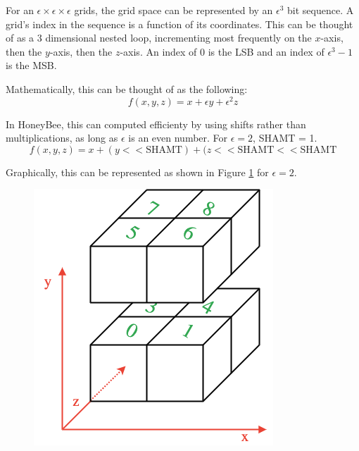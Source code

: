 For an $\epsilon \times \epsilon \times \epsilon$ grids, the grid space can be represented by an $\epsilon^3$ bit sequence.
A grid's index in the sequence is a function of its coordinates. This can be thought of as a 3 dimensional nested loop, incrementing most frequently on the $x$-axis, then the $y$-axis, then the $z$-axis. An index of 0 is the \gls{LSB} and an index of $\epsilon^3 - 1$ is the \gls{MSB}.

Mathematically, this can be thought of as the following: \\

$$f(x,y,z) = x + \epsilon y + \epsilon^2 z$$

In HoneyBee, this can computed efficienty by using shifts rather than multiplications, as long as $\epsilon$ is an even number. For $\epsilon=2$, SHAMT = 1. \\

$$f(x,y,z) = x + (y << \text{SHAMT}) + (z << \text{SHAMT} << \text{SHAMT}$$

Graphically, this can be represented as shown in Figure \ref{fig:honeybee_mapping} for $\epsilon = 2$.

\begin{figure}[H]
\begin{centering}
\includegraphics[width=0.6\linewidth]{appendices/honeybee/img/mapping.png}
\label{fig:honeybee_mapping}
\end{centering}
\end{figure}